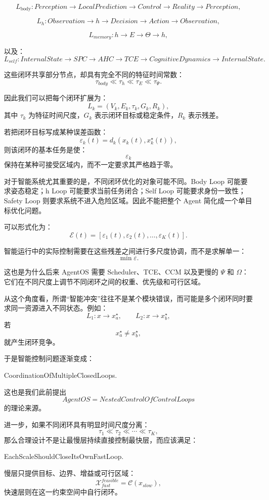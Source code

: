 \[
L_{\mathrm{body}}
:
Perception
\rightarrow
LocalPrediction
\rightarrow
Control
\rightarrow
Reality
\rightarrow
Perception,
\]

\[
L_h:
Observation
\rightarrow
h
\rightarrow
Decision
\rightarrow
Action
\rightarrow
Observation,
\]

\[
L_{memory}:
h
\rightarrow
E
\rightarrow
\Theta
\rightarrow
h,
\]

以及：
\[
L_{self}:
InternalState
\rightarrow
SPC
\rightarrow
AHC
\rightarrow
TCE
\rightarrow
CognitiveDynamics
\rightarrow
InternalState.
\]

这些闭环共享部分节点，却具有完全不同的特征时间常数：
\[
\tau_{body}
\ll
\tau_h
\ll
\tau_E
\ll
\tau_\Psi.
\]

因此我们可以把每个闭环扩展为：
\[
L_k
=
\left(
V_k,
E_k,
\tau_k,
G_k,
R_k
\right),
\]
其中 $\tau_k$ 为特征时间尺度，$G_k$ 表示闭环目标或稳定条件，$R_k$ 表示残差。

若把闭环目标写成某种误差函数：
\[
\varepsilon_k(t)
=
d_k
\left(
x_k(t),
x_k^\star(t)
\right),
\]
则该闭环的基本任务是使：
\[
\varepsilon_k
\]
保持在某种可接受区域内，而不一定要求其严格趋于零。

对于智能系统尤其重要的是，不同闭环优化的对象可能不同。Body Loop 可能要求姿态稳定；h Loop 可能要求当前任务闭合；Self Loop 可能要求身份一致性；Safety Loop 则要求系统不进入危险区域。因此不能把整个 Agent 简化成一个单目标优化问题。

可以形式化为：
\[
\mathcal E(t)
=
\left[
\varepsilon_1(t),
\varepsilon_2(t),
\ldots,
\varepsilon_K(t)
\right].
\]

智能运行中的实际控制需要在这些残差之间进行多尺度协调，而不是求解单一：
\[
\min \varepsilon.
\]

这也是为什么后来 AgentOS 需要 Scheduler、TCE、CCM 以及更慢的 $\Psi$ 和 $\Omega$：它们在不同尺度上调节不同闭环之间的权重、优先级和可行区域。

从这个角度看，所谓“智能冲突”往往不是某个模块错误，而可能是多个闭环同时要求同一资源进入不同状态。例如：
\[
L_1:x\rightarrow x_a^\star,
\qquad
L_2:x\rightarrow x_b^\star,
\]
若
\[
x_a^\star\neq x_b^\star,
\]
就产生闭环竞争。

于是智能控制问题逐渐变成：
\begin{statementbox}
CoordinationOfMultipleClosedLoops.
\end{statementbox}

这也是我们此前提出
\[
AgentOS=NestedControlOfControlLoops
\]
的理论来源。

进一步，如果不同闭环具有明显时间尺度分离：
\[
\tau_1\ll\tau_2\ll\cdots\ll\tau_K,
\]
那么合理设计不是让最慢层持续直接控制最快层，而应该满足：
\begin{statementbox}
EachScaleShouldCloseItsOwnFastLoop.
\end{statementbox}
慢层只提供目标、边界、增益或可行区域：
\[
\mathcal X_{fast}^{feasible}
=
\mathcal C(x_{slow}),
\]
快速层则在这一约束空间中自行闭环。

